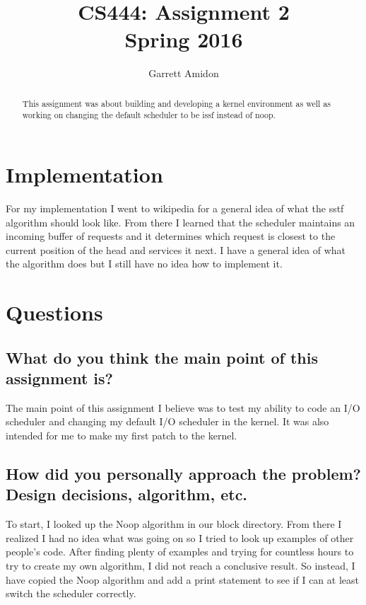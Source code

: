 \documentclass[letterpaper,10pt,titlepage,draftclsnofoot,onecolumn]{IEEEtran}
\title{CS444: Assignment 2 \\
	\large Spring 2016}
\author{Garrett Amidon}
\begin{document}
\begin{titlingpage}
    \maketitle
	\centering{}
    \begin{abstract}
        This assignment was about building and developing a kernel environment as well as working on changing the default scheduler to be issf instead of noop.   
    \end{abstract}
\end{titlingpage}

\section{Implementation}

For my implementation I went to wikipedia for a general idea of what the sstf algorithm should look like. \cite{wiki} From there I learned that the scheduler maintains an incoming buffer of requests and it determines which request is closest to the current position of the head and services it next. I have a general idea of what the algorithm does but I still have no idea how to implement it. 

\section{Questions}
\subsection{What do you think the main point of this assignment is?}
The main point of this assignment I believe was to test my ability to code an I/O scheduler and changing my default I/O scheduler in the kernel. It was also intended for me to make my first patch to the kernel. 
\subsection{How did you personally approach the problem? Design decisions, algorithm, etc.}
To start, I looked up the Noop algorithm in our block directory. From there I realized I had no idea what was going on so I tried to look up examples of other people's code. After finding plenty of examples and trying for countless hours to try to create my own algorithm, I did not reach a conclusive result. So instead, I have copied the Noop algorithm and add a print statement to see if I can at least switch the scheduler correctly. 
\end{document}
